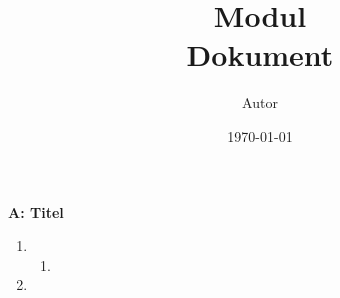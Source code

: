 \documentclass[12pt]{article}
\title {
	\textbf{Modul}\\
	[1ex] \large{
		\textbf{Dokument}
	}
}
\author{Autor}
\date{\today}
\begin{document}
	\addtocounter{page}{0}
	\maketitle

	\noindent\textbf{A: Titel}
	\begin{enumerate}
		\item
		\begin{enumerate}
			\item
		\end{enumerate}

		\item
	\end{enumerate}
\end{document}
